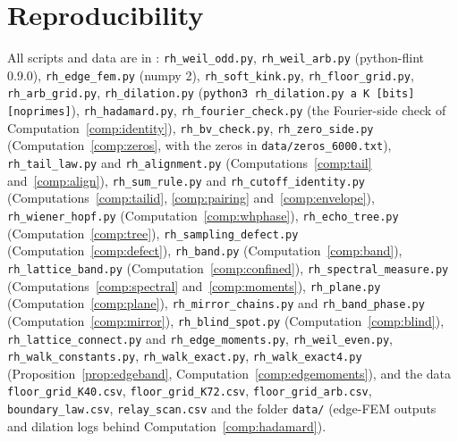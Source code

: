 \documentclass[11pt]{article}
\theoremstyle{definition}
\theoremstyle{remark}
\begin{document}
\section*{Reproducibility}
{\sloppy All scripts and data are in \cite{michaels-repo}: \texttt{rh\_weil\_odd.py}, \texttt{rh\_weil\_arb.py} (python-flint 0.9.0), \texttt{rh\_edge\_fem.py} (numpy 2), \texttt{rh\_soft\_kink.py}, \texttt{rh\_floor\_grid.py}, \texttt{rh\_arb\_grid.py}, \texttt{rh\_dilation.py} (\texttt{python3 rh\_dilation.py a K [bits] [noprimes]}), \texttt{rh\_hadamard.py}, \texttt{rh\_fourier\_check.py} (the Fourier-side check of Computation~\ref{comp:identity}), \texttt{rh\_bv\_check.py}, \texttt{rh\_zero\_side.py} (Computation~\ref{comp:zeros}, with the zeros in \texttt{data/zeros\_6000.txt}), \texttt{rh\_tail\_law.py} and \texttt{rh\_alignment.py} (Computations~\ref{comp:tail} and~\ref{comp:align}), \texttt{rh\_sum\_rule.py} and \texttt{rh\_cutoff\_identity.py} (Computations~\ref{comp:tailid}, \ref{comp:pairing} and~\ref{comp:envelope}), \texttt{rh\_wiener\_hopf.py} (Computation~\ref{comp:whphase}), \texttt{rh\_echo\_tree.py} (Computation~\ref{comp:tree}), \texttt{rh\_sampling\_defect.py} (Computation~\ref{comp:defect}), \texttt{rh\_band.py} (Computation~\ref{comp:band}), \texttt{rh\_lattice\_band.py} (Computation~\ref{comp:confined}), \texttt{rh\_spectral\_measure.py} (Computations~\ref{comp:spectral} and~\ref{comp:moments}), \texttt{rh\_plane.py} (Computation~\ref{comp:plane}), \texttt{rh\_mirror\_chains.py} and \texttt{rh\_band\_phase.py} (Computation~\ref{comp:mirror}), \texttt{rh\_blind\_spot.py} (Computation~\ref{comp:blind}), \texttt{rh\_lattice\_connect.py} and \texttt{rh\_edge\_moments.py}, \texttt{rh\_weil\_even.py}, \texttt{rh\_walk\_constants.py}, \texttt{rh\_walk\_exact.py}, \texttt{rh\_walk\_exact4.py} (Proposition~\ref{prop:edgeband}, Computation~\ref{comp:edgemoments}), and the data \texttt{floor\_grid\_K40.csv}, \texttt{floor\_grid\_K72.csv}, \texttt{floor\_grid\_arb.csv}, \texttt{boundary\_law.csv}, \texttt{relay\_scan.csv} and the folder \texttt{data/} (edge-FEM outputs and dilation logs behind Computation~\ref{comp:hadamard}).\par}
\end{document}
